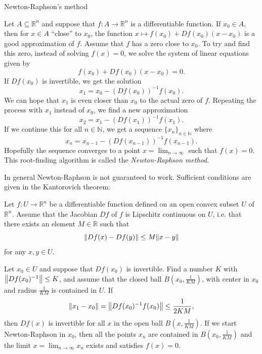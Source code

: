 Newton-Raphson's method

Let $A\subseteq\mathbb{R}^n$ and suppose that $f\colon A \to\mathbb{R}^n$ is a differentiable function. If $x_0\in A$, then for $x\in A$ “close” to $x_0$, the function $x\mapsto f(x_0)+Df(x_0)(x-x_0)$ is a good approximation of $f$. Assume that $f$ has a zero close to $x_0$. To try and find this zero, instead of solving $f(x)=0$, we solve the system of linear equations given by
\begin{equation*}
  f(x_0)+Df(x_0)(x-x_0) = 0.
\end{equation*}
If $Df(x_0)$ is invertible, we get the solution
\begin{equation*}
  x_1=x_0-(Df(x_0))^{-1}f(x_0).
\end{equation*}
We can hope that $x_1$ is even closer than $x_0$ to the actual zero of $f$. Repeating the process with $x_1$ instead of $x_0$, we find a new approximation
\begin{equation*}
  x_2=x_1-(Df(x_1))^{-1}f(x_1).
\end{equation*}
If we continue this for all $n\in\mathbb{N}$, we get a sequence $\{x_n\}_{n\in\mathbb{N}}$ where
\begin{equation*}
  x_n=x_{n-1}-(Df(x_{n-1}))^{-1}f(x_{n-1}).
\end{equation*}
Hopefully the sequence converges to a point $x=\lim_{n\to\infty}$ such that $f(x)=0$. This root-finding algorithm is called the \emph{Newton-Raphson method}.

In general Newton-Raphson is not guaranteed to work. Sufficient conditions are given in the Kantorovich theorem:
\begin{theorem}
  Let $f\colon U\to\mathbb{R}^n$ be a differentiable function defined on an open convex subset $U$ of $\mathbb{R}^n$. Assume that the Jacobian $Df$ of $f$ is Lipschitz continuous on $U$, i.e. that there exists an element $M\in\mathbb{R}$ such that
  \begin{equation*}
    \norm{Df(x)-Df(y)}\le M\norm{x-y}
  \end{equation*}
  for any $x,y\in U$.

Let $x_0\in U$ and suppose that $Df(x_0)$ is invertible. Find a number $K$ with $\norm{Df(x_0)^{-1}}\le K$, and assume that the closed ball $B\left(x_0,\frac{1}{KM}\right)$, with center in $x_0$ and radius $\frac{1}{KM}$ is contained in $U$. If
\begin{equation*}
  \norm{x_1-x_0}=\norm{Df(x_0)^{-1}f(x_0)}\le\frac{1}{2KM},
\end{equation*}
then $Df(x)$ is invertible for all $x$ in the open ball $B\left(x,\frac{1}{KM}\right)$. If we start Newton-Raphson in $x_0$, then all the points $x_n$ are contained in $B\left(x_0,\frac{1}{KM}\right)$ and the limit $x=\lim_{n\to\infty}x_n$ exists and satisfies $f(x)=0$.
\end{theorem}

